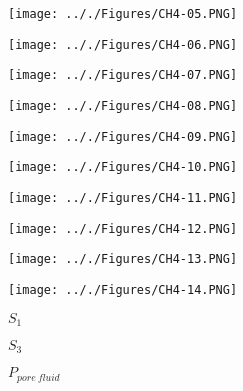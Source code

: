 \documentclass[onecolumn,11pt]{report}
\def\lthtmlcheckvsize{\ifdim\ht\sizebox<\vsize 
  \ifdim\wd\sizebox<\hsize\expandafter\hfill\fi \expandafter\vfill
  \else\expandafter\vss\fi}%
\begin{document}
{\newpage\clearpage
{}%
\texttt{[image: .././Figures/CH4-05.PNG]}%
\lthtmlpictureZ
\lthtmlcheckvsize\clearpage}

{\newpage\clearpage
{}%
\texttt{[image: .././Figures/CH4-06.PNG]}%
\lthtmlpictureZ
\lthtmlcheckvsize\clearpage}

{\newpage\clearpage
{}%
\texttt{[image: .././Figures/CH4-07.PNG]}%
\lthtmlpictureZ
\lthtmlcheckvsize\clearpage}

{\newpage\clearpage
{}%
\texttt{[image: .././Figures/CH4-08.PNG]}%
\lthtmlpictureZ
\lthtmlcheckvsize\clearpage}

{\newpage\clearpage
{}%
\texttt{[image: .././Figures/CH4-09.PNG]}%
\lthtmlpictureZ
\lthtmlcheckvsize\clearpage}

{\newpage\clearpage
{}%
\texttt{[image: .././Figures/CH4-10.PNG]}%
\lthtmlpictureZ
\lthtmlcheckvsize\clearpage}

{\newpage\clearpage
{}%
\texttt{[image: .././Figures/CH4-11.PNG]}%
\lthtmlpictureZ
\lthtmlcheckvsize\clearpage}

{\newpage\clearpage
{}%
\texttt{[image: .././Figures/CH4-12.PNG]}%
\lthtmlpictureZ
\lthtmlcheckvsize\clearpage}

{\newpage\clearpage
{}%
\texttt{[image: .././Figures/CH4-13.PNG]}%
\lthtmlpictureZ
\lthtmlcheckvsize\clearpage}

{\newpage\clearpage
{}%
\texttt{[image: .././Figures/CH4-14.PNG]}%
\lthtmlpictureZ
\lthtmlcheckvsize\clearpage}

{\newpage\clearpage
{}%
$ S_1$%
\lthtmlindisplaymathZ
\lthtmlcheckvsize\clearpage}

{\newpage\clearpage
{}%
$ S_3$%
\lthtmlindisplaymathZ
\lthtmlcheckvsize\clearpage}

{\newpage\clearpage
{}%
$ P_{pore \: fluid}$%
\lthtmlindisplaymathZ
\lthtmlcheckvsize\clearpage}
\end{document}
